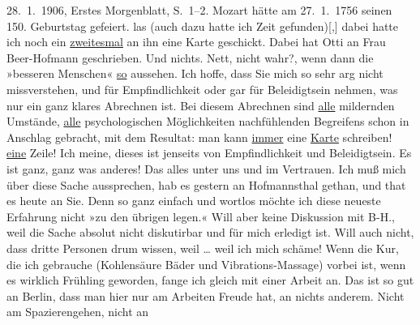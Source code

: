 \begin{ledgroupsized}[t]{13cm}
{{{                        28. 1. 1906, Erstes Morgenblatt, S. 1–2. Mozart hätte am 27. 1. 1756
                  seinen 150. Geburtstag gefeiert.}}}\label{K_L03415-88h} las (auch dazu hatte ich Zeit
                  gefunden){[},{]} dabei hatte ich noch ein \uline{zweitesmal} an ihn eine Karte geschickt. Dabei hat Otti an Frau
                  Beer-Hofmann geschrieben. Und nichts. Nett, nicht wahr?, wenn dann die
               »besseren Menschen« \uline{so} aussehen. Ich hoffe, dass Sie
               mich so sehr arg nicht missverstehen, und für Empfindlichkeit oder gar für
               Beleidigtsein nehmen, was nur ein ganz klares Abrechnen ist. Bei diesem Abrechnen
               sind \uline{alle} mildernden Umstände, \uline{alle} psychologischen Möglichkeiten nachfühlenden Begreifens schon in
               Anschlag gebracht, mit dem Resultat: man kann \uline{immer}
               eine \uline{Karte} schreiben! \uline{eine} Zeile! Ich meine, dieses ist jenseits von Empfindlichkeit und
               Beleidigtsein. Es ist ganz, ganz was anderes! Das alles unter uns und im Vertrauen.
               Ich muß mich über diese Sache aussprechen, hab es gestern an Hofmannsthal gethan, und that es heute an Sie. Denn so ganz
               einfach und wortlos möchte ich diese neueste Erfahrung nicht »zu den übrigen legen.«
               Will aber keine Diskussion mit B-H., weil die
               Sache absolut nicht diskutirbar und für mich erledigt ist. Will auch nicht, dass
               dritte Personen drum wissen, weil {\dots} weil ich mich schäme! \pend
           \pstart
           Wenn die Kur, die ich gebrauche (Kohlensäure Bäder und Vibrations-Massage) vorbei
               ist, wenn es wirklich Frühling geworden, fange ich gleich mit einer Arbeit an. Das
               ist so gut an Berlin, dass man hier nur am
               Arbeiten Freude hat, an nichts anderem. Nicht am Spazierengehen, nicht an

\end{ledgroupsized}
